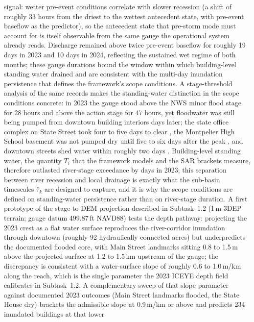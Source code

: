 \documentclass[11pt]{article}
\begin{document}
signal: wetter pre-event conditions correlate with slower recession (a shift of
roughly 33 hours from the driest to the wettest antecedent state, with
pre-event baseflow as the predictor), so the antecedent state that pre-storm
mode must account for is itself observable from the same gauge the operational
system already reads.
Discharge remained above twice pre-event baseflow for roughly 19 days in 2023 and
10 days in 2024, reflecting the sustained wet regime of both months; these gauge
durations bound the window within which building-level standing water drained and
are consistent with the multi-day inundation persistence that defines the
framework's scope conditions.
A stage-threshold analysis of the same records makes the standing-water
distinction in the scope conditions concrete: in 2023 the gauge stood above the
NWS minor flood stage for 28 hours and above the action stage for 47 hours, yet
floodwater was still being pumped from downtown building interiors days later;
the state office complex on State Street took four to five days to clear
\cite{vermontpublic2023stateflood}, the Montpelier High School basement was not
pumped dry until five to six days after the peak \cite{vtdigger2023schools}, and
downtown streets shed water within roughly two days \cite{vermontpublic2023recede}.
Building-level standing water, the quantity $T_i$ that the framework models and
the SAR brackets measure, therefore outlasted river-stage exceedance by days in
2023; this separation between river recession and local drainage is exactly what
the sub-basin timescales $\hat{\tau}_k$ are designed to capture, and it is why
the scope conditions are defined on standing-water persistence rather than on
river-stage duration.
A first prototype of the stage-to-DEM projection described in Subtask~1.2
(1\,m 3DEP terrain; gauge datum 499.87\,ft NAVD88) tests the depth pathway:
projecting the 2023 crest as a flat water surface reproduces the river-corridor
inundation through downtown (roughly 92 hydraulically connected acres) but
underpredicts the documented flooded core, with Main Street landmarks sitting
0.8 to 1.5\,m above the projected surface at 1.2 to 1.5\,km upstream of the
gauge; the discrepancy is consistent with a water-surface slope of roughly 0.6
to 1.0\,m/km along the reach, which is the single parameter the 2023 ICEYE
depth field calibrates in Subtask~1.2.
A complementary sweep of that slope parameter against documented 2023 outcomes
(Main Street landmarks flooded, the State House dry) brackets the admissible
slope at 0.9\,m/km or above and predicts 234 inundated buildings at that lower
\end{document}
